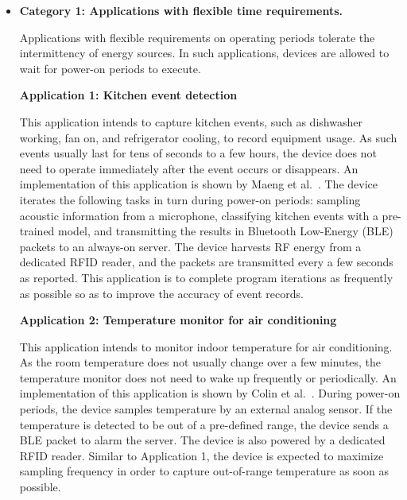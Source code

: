 \begin{itemize}

  \item \textbf{Category 1: Applications with flexible time requirements.}
  
  Applications with flexible requirements on operating periods tolerate the intermittency of energy sources. In such applications, devices are allowed to wait for power-on periods to execute.

  \textbf{Application 1: Kitchen event detection} 
  
  This application intends to capture kitchen events, such as dishwasher working, fan on, and refrigerator cooling, to record equipment usage. 
  As such events usually last for tens of seconds to a few hours, the device does not need to operate immediately after the event occurs or disappears. 
  An implementation of this application is shown by Maeng et al.~\cite{maeng2019supporting}. 
  The device iterates the following tasks in turn during power-on periods: sampling acoustic information from a microphone, classifying kitchen events with a pre-trained model, and transmitting the results in Bluetooth Low-Energy (BLE) packets to an always-on server. 
  The device harvests RF energy from a dedicated RFID reader, and the packets are transmitted every a few seconds as reported. 
  This application is to complete program iterations as frequently as possible so as to improve the accuracy of event records. 

  \textbf{Application 2: Temperature monitor for air conditioning}

  This application intends to monitor indoor temperature for air conditioning. 
  As the room temperature does not usually change over a few minutes, the temperature monitor does not need to wake up frequently or periodically. 
  An implementation of this application is shown by Colin et al.~\cite{colin2018reconfigurable}. 
  During power-on periods, the device samples temperature by an external analog sensor. 
  If the temperature is detected to be out of a pre-defined range, the device sends a BLE packet to alarm the server. 
  The device is also powered by a dedicated RFID reader. 
  Similar to Application 1, the device is expected to maximize sampling frequency in order to capture out-of-range temperature as soon as possible.


\end{itemize}
